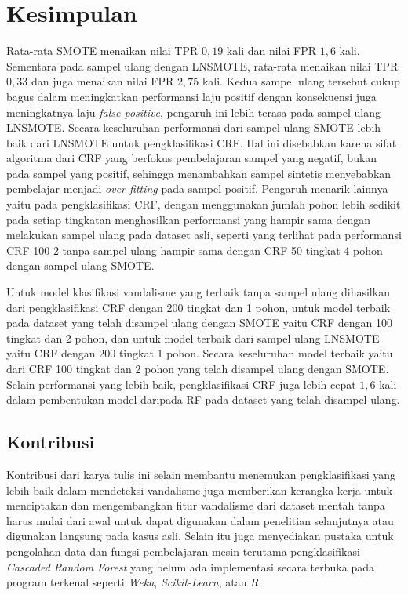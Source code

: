 \chapter{Kesimpulan}

Rata-rata SMOTE menaikan nilai TPR $0,19$ kali dan nilai FPR $1,6$ kali.
Sementara pada sampel ulang dengan LNSMOTE, rata-rata menaikan nilai TPR $0,33$
dan juga menaikan nilai FPR $2,75$ kali.
Kedua sampel ulang tersebut cukup bagus dalam meningkatkan performansi laju
positif dengan konsekuensi juga meningkatnya laju \textit{false-positive},
pengaruh ini lebih terasa pada sampel ulang LNSMOTE.
Secara keseluruhan performansi dari sampel ulang SMOTE lebih baik dari
LNSMOTE untuk pengklasifikasi CRF.
Hal ini disebabkan karena sifat algoritma dari CRF yang berfokus pembelajaran
sampel yang negatif, bukan pada sampel yang positif, sehingga menambahkan
sampel sintetis menyebabkan pembelajar menjadi \textit{over-fitting} pada
sampel positif.
Pengaruh menarik lainnya yaitu pada pengklasifikasi CRF, dengan menggunakan
jumlah pohon lebih sedikit pada setiap tingkatan menghasilkan performansi yang
hampir sama dengan melakukan sampel ulang pada dataset asli, seperti yang
terlihat pada performansi CRF-100-2 tanpa sampel ulang hampir sama dengan CRF
50 tingkat 4 pohon dengan sampel ulang SMOTE.

Untuk model klasifikasi vandalisme yang terbaik tanpa sampel ulang dihasilkan
dari pengklasifikasi CRF dengan 200 tingkat dan 1 pohon, untuk model terbaik
pada dataset yang telah disampel ulang dengan SMOTE yaitu CRF dengan 100
tingkat dan 2 pohon, dan untuk model terbaik dari sampel ulang LNSMOTE yaitu
CRF dengan 200 tingkat 1 pohon. Secara keseluruhan model terbaik yaitu dari CRF
100 tingkat dan 2 pohon yang telah disampel ulang dengan SMOTE.
Selain performansi yang lebih baik, pengklasifikasi CRF juga lebih cepat $1,6$
kali dalam pembentukan model daripada RF pada dataset yang telah disampel
ulang.

\section{Kontribusi}

Kontribusi dari karya tulis ini selain membantu menemukan pengklasifikasi yang
lebih baik dalam mendeteksi vandalisme juga memberikan kerangka kerja untuk
menciptakan dan mengembangkan fitur vandalisme dari dataset mentah tanpa harus
mulai dari awal untuk dapat digunakan dalam penelitian selanjutnya atau
digunakan langsung pada kasus asli. Selain itu juga menyediakan pustaka untuk
pengolahan data dan fungsi pembelajaran mesin terutama pengklasifikasi
\textit{Cascaded Random Forest} yang belum ada implementasi secara terbuka pada
program terkenal seperti \textit{Weka}, \textit{Scikit-Learn}, atau \textit{R}.

